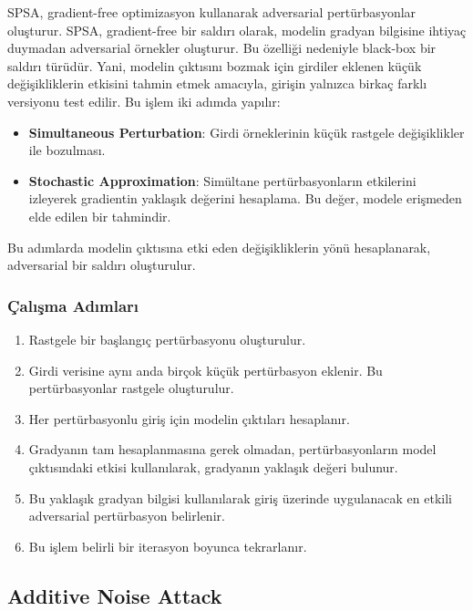 SPSA, gradient-free optimizasyon kullanarak adversarial pertürbasyonlar oluşturur. SPSA, gradient-free bir saldırı olarak, modelin gradyan bilgisine ihtiyaç duymadan adversarial örnekler oluşturur. Bu özelliği nedeniyle black-box bir saldırı türüdür. Yani, modelin çıktısını bozmak için girdiler eklenen küçük değişikliklerin etkisini tahmin etmek amacıyla, girişin yalnızca birkaç farklı versiyonu test edilir. Bu işlem iki adımda yapılır:

\begin{itemize}
    \item \textbf{Simultaneous Perturbation}: Girdi örneklerinin küçük rastgele değişiklikler ile bozulması.
    \item \textbf{Stochastic Approximation}: Simültane pertürbasyonların etkilerini izleyerek gradientin yaklaşık değerini hesaplama. Bu değer, modele erişmeden elde edilen bir tahmindir.
\end{itemize}

Bu adımlarda modelin çıktısına etki eden değişikliklerin yönü hesaplanarak, adversarial bir saldırı oluşturulur.

\subsubsection{Çalışma Adımları}

\begin{enumerate}
    \item Rastgele bir başlangıç pertürbasyonu oluşturulur.
    \item Girdi verisine aynı anda birçok küçük pertürbasyon eklenir. Bu pertürbasyonlar rastgele oluşturulur.
    \item Her pertürbasyonlu giriş için modelin çıktıları hesaplanır. 
    \item Gradyanın tam hesaplanmasına gerek olmadan, pertürbasyonların model çıktısındaki etkisi kullanılarak, gradyanın yaklaşık değeri bulunur.
    \item Bu yaklaşık gradyan bilgisi kullanılarak giriş üzerinde uygulanacak en etkili adversarial pertürbasyon belirlenir.
    \item Bu işlem belirli bir iterasyon boyunca tekrarlanır.
\end{enumerate}

\newpage

\subsection{Additive Noise Attack}

